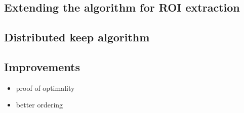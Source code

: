 \documentclass[conference]{IEEEtran}
\begin{document}
\subsection{Extending the algorithm for ROI extraction}
\subsection{Distributed keep algorithm}
\subsection{Improvements}

\begin{itemize}
  \item proof of optimality
  \item better ordering
\end{itemize}
\end{document}
